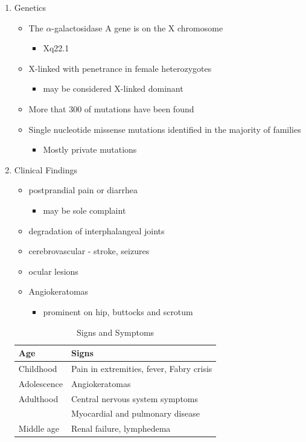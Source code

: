 \documentclass{scrartcl}
\begin{document}
\begin{enumerate}
\item Genetics
\label{sec:org98c015b}
\begin{itemize}
\item The \(\alpha\)-galactosidase A gene is on the X chromosome
\begin{itemize}
\item Xq22.1
\end{itemize}
\item X-linked with penetrance in female heterozygotes
\begin{itemize}
\item may be considered X-linked dominant
\end{itemize}
\item More that 300 of mutations have been found
\item Single nucleotide missense mutations identified in the majority of families
\begin{itemize}
\item Mostly private mutations
\end{itemize}
\end{itemize}

\item Clinical Findings
\label{sec:orgc3d7b08}

\begin{itemize}
\item postprandial pain or diarrhea
\begin{itemize}
\item may be sole complaint
\end{itemize}
\item degradation of interphalangeal joints
\item cerebrovascular - stroke, seizures
\item ocular lesions
\item Angiokeratomas
\begin{itemize}
\item prominent on hip, buttocks and scrotum
\end{itemize}
\end{itemize}

\begin{table}[htbp]
\caption{\label{tab:orgcfe0cb4}
Signs and Symptoms}
\centering
\begin{tabular}{ll}
Age & Signs\\
\hline
Childhood & Pain in extremities, fever, Fabry crisis \footnotemark\\
Adolescence & Angiokeratomas\\
Adulthood & Central nervous system symptoms\\
 & Myocardial and pulmonary disease\\
Middle age & Renal failure, lymphedema\\
\end{tabular}
\end{table}
\end{enumerate}
\end{document}
